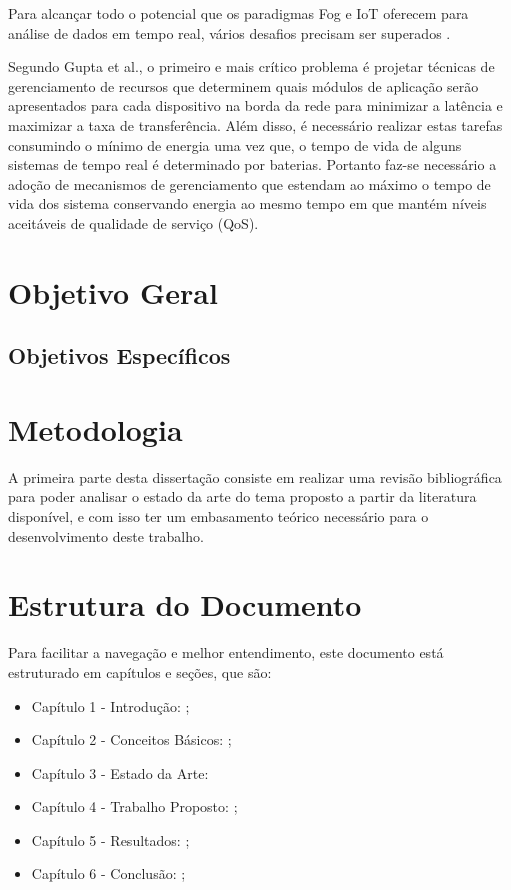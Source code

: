 Para alcançar todo o potencial que os paradigmas Fog e IoT oferecem para análise de dados em tempo real, vários desafios precisam ser superados \cite{dastjerdi2016fog,computing2016internet,gupta2016ifogsim}. 

Segundo Gupta et al.\cite{gupta2016ifogsim}, o primeiro e mais crítico problema é projetar técnicas de gerenciamento de recursos que determinem quais módulos de aplicação serão apresentados para cada dispositivo na borda da rede para minimizar a latência e maximizar a taxa de transferência. Além disso, é necessário realizar estas tarefas consumindo o mínimo de energia uma vez que, o tempo de vida de alguns sistemas de tempo real é determinado por baterias. Portanto faz-se necessário a adoção de mecanismos de gerenciamento que estendam ao máximo o tempo de vida dos sistema conservando energia ao mesmo tempo em que mantém níveis aceitáveis de qualidade de serviço (QoS). 

\section{Objetivo Geral}

\subsection{Objetivos Específicos}

\section{Metodologia}

A primeira parte desta dissertação consiste em realizar uma revisão bibliográfica para poder analisar o estado da arte do tema proposto a partir da literatura disponível, e com isso ter um embasamento teórico necessário para o desenvolvimento deste trabalho.

\section{Estrutura do Documento}

Para facilitar a navegação e melhor entendimento, este documento está
estruturado em capítulos e seções, que são:
\begin{itemize}
\item {Capítulo 1 - Introdução}: \cite{Yu:2004:ESG:1015090.1015207};
\item {Capítulo 2 - Conceitos Básicos}: \cite{Cormen:2009};
\item {Capítulo 3 - Estado da Arte}: \cite{Weicker:1984:DSS:358274.358283}
\item {Capítulo 4 - Trabalho Propost}o: \cite{IEEE_802_11:6178212};
\item {Capítulo 5 - Resultados}: \cite{Linux:402081};
\item {Capítulo 6 - Conclusão}: \cite{SBC:2012};
\end{itemize}
